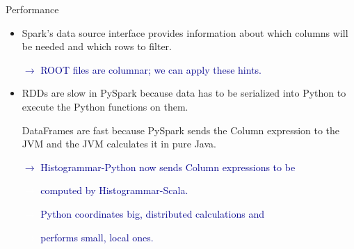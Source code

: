 \documentclass{beamer}
\begin{document}
\begin{frame}{Performance}
\vspace{0.5 cm}
\begin{itemize}\setlength{\itemsep}{0.4 cm}
\item Spark's data source interface provides information about which columns will be needed and which rows to filter.

\vspace{0.2 cm}
\textcolor{darkblue}{$\rightarrow$ ROOT files are columnar; we can apply these hints.}

\item<2-> RDDs are slow in PySpark because data has to be serialized into Python to execute the Python functions on them.

\vspace{0.2 cm}
DataFrames are fast because PySpark sends the Column expression to the JVM and the JVM calculates it in pure Java.

\vspace{0.2 cm}
\textcolor{darkblue}{$\rightarrow$ Histogrammar-Python now sends Column expressions to be}

\textcolor{white}{$\rightarrow$} \textcolor{darkblue}{computed by Histogrammar-Scala.}

\vspace{0.2 cm}
\textcolor{white}{$\rightarrow$} \textcolor{darkblue}{Python coordinates big, distributed calculations and}

\textcolor{white}{$\rightarrow$} \textcolor{darkblue}{performs small, local ones.}
\end{itemize}
\end{frame}
\end{document}
